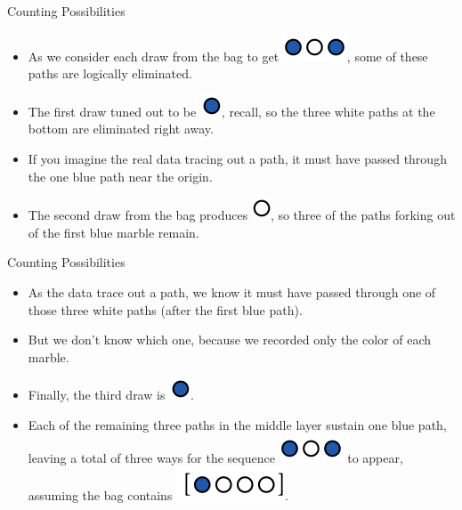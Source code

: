 \documentclass[handout]{beamer}
\begin{document}
\begin{frame}{Counting Possibilities}
\scriptsize{
\begin{itemize}
 \item As we consider each draw from the bag to get \includegraphics[scale=0.5]{pics/marbles2.png}, some of these paths are logically eliminated.
 \item The first draw tuned out to be \includegraphics[scale=0.3]{pics/marbles6.png}, recall, so the three white paths at the bottom are eliminated right away. 
 \item If you imagine the real data tracing out a path, it must have passed through the one blue path near the origin. 
 \item The second draw from the bag produces \includegraphics[scale=0.3]{pics/marbles5.png}, so three of the paths forking out of the first blue marble remain.
 \end{itemize}
 } 
\end{frame}


\begin{frame}{Counting Possibilities}
\scriptsize{
\begin{itemize}
 \item As the data trace out a path, we know it must have passed through one of those three white paths (after the first blue path).
 \item But we don't know which one, because we recorded only the color of each marble.
 \item Finally, the third draw is \includegraphics[scale=0.3]{pics/marbles6.png}. 
 \item Each of the remaining three paths in the middle layer sustain one blue path, leaving a total of three ways for the sequence \includegraphics[scale=0.3]{pics/marbles2.png} to appear, assuming the bag contains \includegraphics[scale=0.3]{pics/marbles3.png}.
\end{itemize}
 } 
\end{frame}
\end{document}
